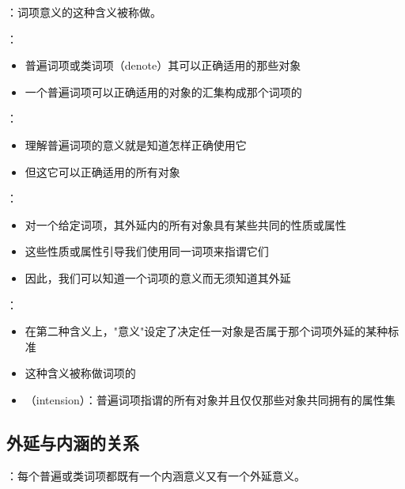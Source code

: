 \begin{theorembox}[title=外延的基本概念]
：词项意义的这种含义被称做。

：
\begin{itemize}
  \item 普遍词项或类词项（denote）其可以正确适用的那些对象
  \item 一个普遍词项可以正确适用的对象的汇集构成那个词项的
\end{itemize}
\end{theorembox}

\begin{theorembox}[title=内涵的基本概念]
：
\begin{itemize}
  \item 理解普遍词项的意义就是知道怎样正确使用它
  \item 但这它可以正确适用的所有对象
\end{itemize}

：
\begin{itemize}
  \item 对一个给定词项，其外延内的所有对象具有某些共同的性质或属性
  \item 这些性质或属性引导我们使用同一词项来指谓它们
  \item 因此，我们可以知道一个词项的意义而无须知道其外延
\end{itemize}

：
\begin{itemize}
  \item 在第二种含义上，"意义"设定了决定任一对象是否属于那个词项外延的某种标准
  \item 这种含义被称做词项的
  \item {}（intension）：普遍词项指谓的所有对象并且仅仅那些对象共同拥有的属性集
\end{itemize}
\end{theorembox}

\subsection{外延与内涵的关系}

\begin{theorembox}[title=普遍词项的双重意义]
：每个普遍或类词项都既有一个内涵意义又有一个外延意义。
\end{theorembox}

